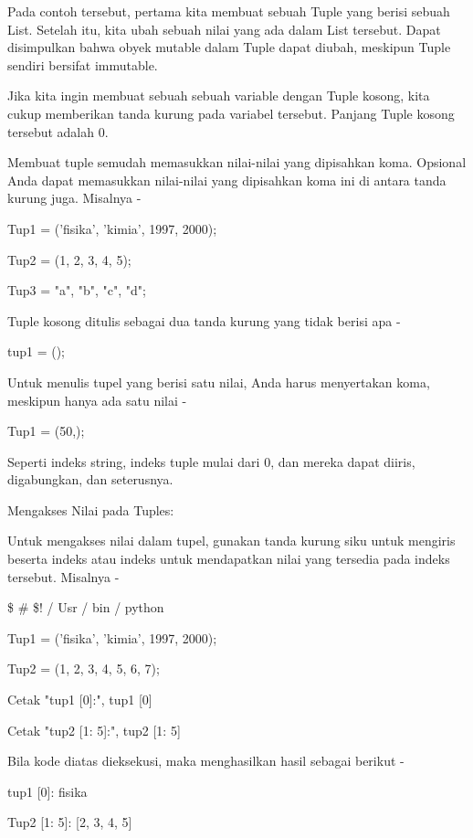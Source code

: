 Pada contoh tersebut, pertama kita membuat sebuah Tuple yang berisi sebuah List. Setelah itu, kita ubah sebuah nilai yang ada dalam List tersebut. Dapat disimpulkan bahwa obyek mutable dalam Tuple dapat diubah, meskipun Tuple sendiri bersifat immutable. \par

Jika kita ingin membuat sebuah sebuah variable dengan Tuple kosong, kita cukup memberikan tanda kurung pada variabel tersebut. Panjang Tuple kosong tersebut adalah 0. \par

Membuat tuple semudah memasukkan nilai-nilai yang dipisahkan koma. Opsional Anda dapat memasukkan nilai-nilai yang dipisahkan koma ini di antara tanda kurung juga. Misalnya - \par
\vspace{12pt}
Tup1 = ('fisika', 'kimia', 1997, 2000); \par
Tup2 = (1, 2, 3, 4, 5); \par
Tup3 = "a", "b", "c", "d"; \par
Tuple kosong ditulis sebagai dua tanda kurung yang tidak berisi apa - \par
tup1 = (); \par
Untuk menulis tupel yang berisi satu nilai, Anda harus menyertakan koma, meskipun hanya ada satu nilai - \par
Tup1 = (50,); \par
Seperti indeks string, indeks tuple mulai dari 0, dan mereka dapat diiris, digabungkan, dan seterusnya. \par
Mengakses Nilai pada Tuples: \par
Untuk mengakses nilai dalam tupel, gunakan tanda kurung siku untuk mengiris beserta indeks atau indeks untuk mendapatkan nilai yang tersedia pada indeks tersebut. Misalnya - \par
 \$  \#  \$! / Usr / bin / python \par
\vspace{12pt}
Tup1 = ('fisika', 'kimia', 1997, 2000); \par
Tup2 = (1, 2, 3, 4, 5, 6, 7); \par
\vspace{12pt}
Cetak "tup1 [0]:", tup1 [0] \par
Cetak "tup2 [1: 5]:", tup2 [1: 5] \par
Bila kode diatas dieksekusi, maka menghasilkan hasil sebagai berikut - \par
tup1 [0]: fisika \par
Tup2 [1: 5]: [2, 3, 4, 5] \par
